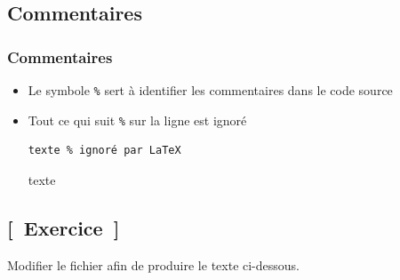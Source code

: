 \subsection{Commentaires}

\begin{frame}[fragile=singleslide]
  \frametitle{Commentaires}
  \begin{itemize}
  \item Le symbole \verb=%= sert à identifier les commentaires dans
    le code source
  \item Tout ce qui suit \verb=%= sur la ligne est ignoré
    \begin{demo}
      \begin{texample}
\begin{lstlisting}
texte % ignoré par LaTeX
\end{lstlisting}
        \producing
        texte %
      \end{texample}
    \end{demo}
  \end{itemize}
\end{frame}

\subsection{[~Exercice~]}

\begin{exercice}
  Modifier le fichier  afin de
  produire le texte ci-dessous.

  \bigskip
  \centering
\end{exercice}

